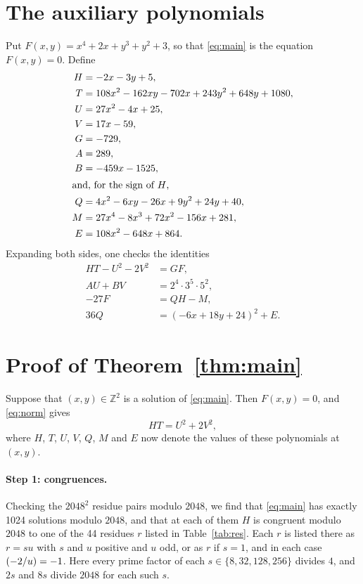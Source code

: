 \documentclass[11pt]{article}
\newcommand{\Z}{\mathbb{Z}}
\newcommand{\leg}[2]{\mathchoice{\biggl(\dfrac{#1}{#2}\biggr)}{(#1/#2)}{(#1/#2)}{(#1/#2)}}
\begin{document}
\section{The auxiliary polynomials}

Put $F(x,y)=x^{4}+2x+y^{3}+y^{2}+3$, so that \eqref{eq:main} is the equation $F(x,y)=0$. Define
\begin{align*}
H&=-2x-3y+5,\\
T&=108x^{2}-162xy-702x+243y^{2}+648y+1080,\\
U&=27x^{2}-4x+25,\\
V&=17x-59,\\
G&=-729,\\
A&=289,\\
B&=-459x-1525,\\
\intertext{and, for the sign of $H$,}
Q&=4x^{2}-6xy-26x+9y^{2}+24y+40,\\
M&=27x^{4}-8x^{3}+72x^{2}-156x+281,\\
E&=108x^{2}-648x+864.
\end{align*}
Expanding both sides, one checks the identities
\begin{align}
HT-U^2-2V^2&=GF,\label{eq:norm}\\
AU+BV&=2^{4}\cdot 3^{5}\cdot 5^{2},\label{eq:bezout}\\
-27F&=QH-M,\label{eq:sign}\\
36Q&=(-6x+18y+24)^2+E.\label{eq:sign2}
\end{align}

\section{Proof of Theorem~\ref{thm:main}}

Suppose that $(x,y)\in\Z^2$ is a solution of \eqref{eq:main}. Then $F(x,y)=0$, and \eqref{eq:norm} gives
\begin{equation}\label{eq:HT}
HT=U^2+2V^2,
\end{equation}
where $H$, $T$, $U$, $V$, $Q$, $M$ and $E$ now denote the values of these polynomials at $(x,y)$.

\paragraph{Step 1: congruences.} Checking the $2048^2$ residue pairs modulo $2048$, we find that \eqref{eq:main} has exactly 1024 solutions modulo $2048$, and that at each of them $H$ is congruent modulo $2048$ to one of the 44 residues $r$ listed in Table~\ref{tab:res}. Each $r$ is listed there as $r=su$ with $s$ and $u$ positive and $u$ odd, or as $r$ if $s=1$, and in each case $\leg{-2}{u}=-1$. Here every prime factor of each $s\in\{8,32,128,256\}$ divides $4$, and $2s$ and $8s$ divide $2048$ for each such $s$.
\end{document}
